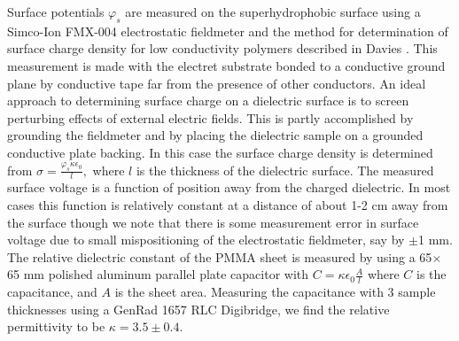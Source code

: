 \documentclass[12pt,a4paper,oneside]{book}
\begin{document}
Surface potentials $\varphi_s$ are measured on the superhydrophobic surface using a Simco-Ion FMX-004 electrostatic fieldmeter and the method for determination of surface charge density for low conductivity polymers described in Davies \cite{davies_examination_1967}. This measurement is made with the electret substrate bonded to a conductive ground plane by conductive tape far from the presence of other conductors. An ideal approach to determining surface charge on a dielectric surface is to screen perturbing effects of external electric fields. This is partly accomplished by grounding the fieldmeter and by placing the dielectric sample on a grounded conductive plate backing. In this case the surface charge density is determined from $\sigma = \frac{\varphi_s \kappa \epsilon_0}{l},$ where $l$ is the thickness of the dielectric surface. The measured surface voltage is a function of position away from the charged dielectric. In most cases this function is relatively constant at a distance of about 1-2 cm away from the surface though we note that there is some measurement error in surface voltage due to small mispositioning of the electrostatic fieldmeter, say by $\pm$1 mm. The relative dielectric constant of the PMMA sheet is measured by using a 65$\times$65 mm polished aluminum parallel plate capacitor with $C = \kappa \epsilon_0 \frac{A}{l}$ where $C$ is the capacitance, and $A$ is the sheet area. Measuring the capacitance with 3 sample thicknesses using a GenRad 1657 RLC Digibridge, we find the relative permittivity to be $\kappa = 3.5 \pm 0.4$.  
\end{document}
